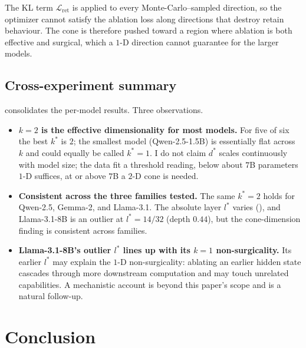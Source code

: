 \documentclass[sn-basic]{sn-jnl}
\newcommand{\Lret}{\mathcal{L}_{\text{ret}}}
\begin{document}
The KL term $\Lret$ is applied to every Monte-Carlo--sampled direction, so the
optimizer cannot satisfy the ablation loss along directions that destroy retain
behaviour. The cone is therefore pushed toward a region where ablation is both
effective and surgical, which a $1$-D direction cannot guarantee for the larger
models.



\subsection{Cross-experiment summary}
\label{sec:exp_summary}
 consolidates the per-model results. Three observations.

\begin{itemize}[leftmargin=*,nosep]
\item \textbf{$k=2$ is the effective dimensionality for most models.} For five
of six the best $k^{*}$ is $2$; the smallest model (Qwen-2.5-1.5B) is
essentially flat across $k$ and could equally be called $k^{*} = 1$. I do not
claim $d^{*}$ scales continuously with model size; the data fit a threshold
reading, below about $7$B parameters $1$-D suffices, at or above $7$B a $2$-D
cone is needed.

\item \textbf{Consistent across the three families tested.} The same $k^{*} = 2$
holds for Qwen-2.5, Gemma-2, and Llama-3.1. The absolute layer $l^{*}$ varies
(), and Llama-3.1-8B is an outlier at $l^{*}=14/32$ (depth
$0.44$), but the cone-dimension finding is consistent across families.

\item \textbf{Llama-3.1-8B's outlier $l^{*}$ lines up with its $k=1$
non-surgicality.} Its earlier $l^{*}$ may explain the $1$-D non-surgicality:
ablating an earlier hidden state cascades through more downstream computation
and may touch unrelated capabilities. A mechanistic account is beyond this
paper's scope and is a natural follow-up.
\end{itemize}


\section{Conclusion}
\label{sec:conclusion}
\end{document}
